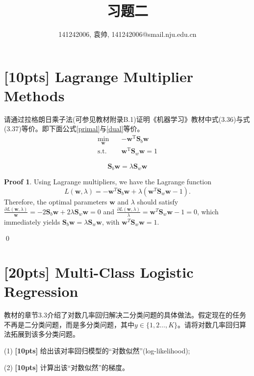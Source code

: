 \documentclass[a4paper,UTF8]{article}
\numberwithin{equation}{section}
\theoremstyle{definition}
\newtheorem*{prove}{Proof}
\begin{document}
\title{习题二}
\author{141242006, 袁帅, 141242006@smail.nju.edu.cn}
\maketitle
\section{[10pts] Lagrange Multiplier Methods}
请通过拉格朗日乘子法(可参见教材附录B.1)证明《机器学习》教材中式(3.36)与式(3.37)等价。即下面公式\eqref{primal}与\eqref{dual}等价。
\begin{equation}
\label{primal}
\begin{split}
 \min_{\mathbf{w}} \quad &-\mathbf{w}^\mathrm{T} \mathbf{S}_b\mathbf{w}\\
\text{s.t.} \quad &\mathbf{w}^\mathrm{T} \mathbf{S}_w\mathbf{w} = 1
\end{split}
\end{equation}

\begin{equation}
\label{dual}
\mathbf{S}_b\mathbf{w} = \lambda \mathbf{S}_w\mathbf{w}
\end{equation}
\begin{prove}
Using Lagrange multipliers, we have the Lagrange function
\begin{equation}
 L(\bm{w},\lambda)=-\bm{w}^T\bm{S}_b\bm{w}+\lambda(\bm{w}^T\bm{S}_w\bm{w}-1).
\end{equation}
Therefore, the optimal parameters $\bm{w}$ and $\lambda$ should satisfy$\frac{\partial{ L(\bm{w},\lambda)}}{\bm{w}}=-2\bm{S}_b\bm{w}+2\lambda\bm{S}_w\bm{w}=0$ and $\frac{\partial{ L(\bm{w},\lambda)}}{\lambda}=\bm{w}^T\bm{S}_w\bm{w}-1=0$, which immediately yields $\bm{S}_b\bm{w}=\lambda\bm{S}_w\bm{w}$, with $\bm{w}^T\bm{S}_w\bm{w}=1$.

\qed
\end{prove}

\section{[20pts] Multi-Class Logistic Regression}
教材的章节3.3介绍了对数几率回归解决二分类问题的具体做法。假定现在的任务不再是二分类问题，而是多分类问题，其中$y\in\{1,2\dots,K\}$。请将对数几率回归算法拓展到该多分类问题。

(1) \textbf{[10pts]} 给出该对率回归模型的“对数似然”(log-likelihood);

(2) \textbf{[10pts]} 计算出该“对数似然”的梯度。
\end{document}
